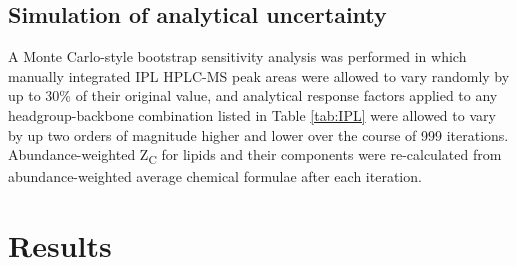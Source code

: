 \subsection{Simulation of analytical uncertainty} A Monte Carlo-style bootstrap sensitivity analysis was performed in which manually integrated IPL HPLC-MS peak areas were allowed to vary randomly by up to 30\% of their original value, and analytical response factors applied to any headgroup-backbone combination listed in Table \ref{tab:IPL} were allowed to vary by up two orders of magnitude higher and lower over the course of 999 iterations. Abundance-weighted Z\textsubscript{C} for lipids and their components were re-calculated from abundance-weighted average chemical formulae after each iteration.


\section{Results}

